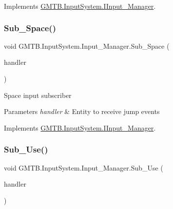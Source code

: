 Implements \mbox{\hyperlink{interface_g_m_t_b_1_1_input_system_1_1_i_input___manager_aa90d83a923d091d5721c7a00be376ed4}{G\+M\+T\+B.\+Input\+System.\+I\+Input\+\_\+\+Manager}}.

\mbox{\label{class_g_m_t_b_1_1_input_system_1_1_input___manager_a44d48f4c8117d99c53bed41b4baa08fd}} 
\subsubsection{\texorpdfstring{Sub\_Space()}{Sub\_Space()}}
{\footnotesize\ttfamily void G\+M\+T\+B.\+Input\+System.\+Input\+\_\+\+Manager.\+Sub\+\_\+\+Space (\begin{DoxyParamCaption}\item[{Event\+Handler$<$ \mbox{\hyperlink{class_g_m_t_b_1_1_input_system_1_1_input_event}{Input\+Event}} $>$}]{handler }\end{DoxyParamCaption})}



Space input subscriber 


\begin{DoxyParams}{Parameters}
{\em handler} & Entity to receive jump events\\
\hline
\end{DoxyParams}


Implements \mbox{\hyperlink{interface_g_m_t_b_1_1_input_system_1_1_i_input___manager_afeec586fb787d0e42f3362b1a465004c}{G\+M\+T\+B.\+Input\+System.\+I\+Input\+\_\+\+Manager}}.

\mbox{\label{class_g_m_t_b_1_1_input_system_1_1_input___manager_a52bf5b862a2139cb93b08dd3d68ff4cc}} 
\subsubsection{\texorpdfstring{Sub\_Use()}{Sub\_Use()}}
{\footnotesize\ttfamily void G\+M\+T\+B.\+Input\+System.\+Input\+\_\+\+Manager.\+Sub\+\_\+\+Use (\begin{DoxyParamCaption}\item[{Event\+Handler$<$ \mbox{\hyperlink{class_g_m_t_b_1_1_input_system_1_1_input_event}{Input\+Event}} $>$}]{handler }\end{DoxyParamCaption})}



